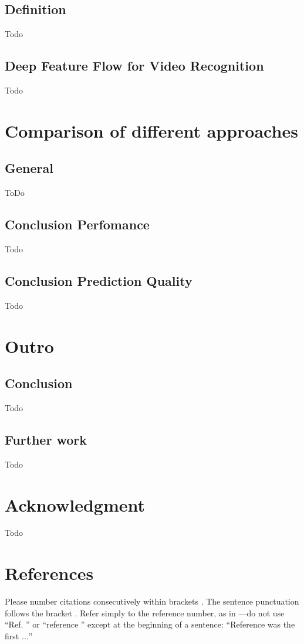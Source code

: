 \documentclass[conference]{IEEEtran}
\begin{document}
\subsection{Definition}
Todo

\subsection{Deep Feature Flow for Video Recognition}
Todo

\section{Comparison of different approaches}

\subsection{General}
ToDo

\subsection{Conclusion Perfomance}
Todo

\subsection{Conclusion Prediction Quality}
Todo


\section{Outro}

\subsection{Conclusion}
Todo

\subsection{Further work}
Todo


\section*{Acknowledgment}
Todo

\section*{References}

Please number citations consecutively within brackets \cite{b1}. The 
sentence punctuation follows the bracket \cite{b2}. Refer simply to the reference 
number, as in \cite{b3}---do not use ``Ref. \cite{b3}'' or ``reference \cite{b3}'' except at 
the beginning of a sentence: ``Reference \cite{b3} was the first $\ldots$''
\end{document}
